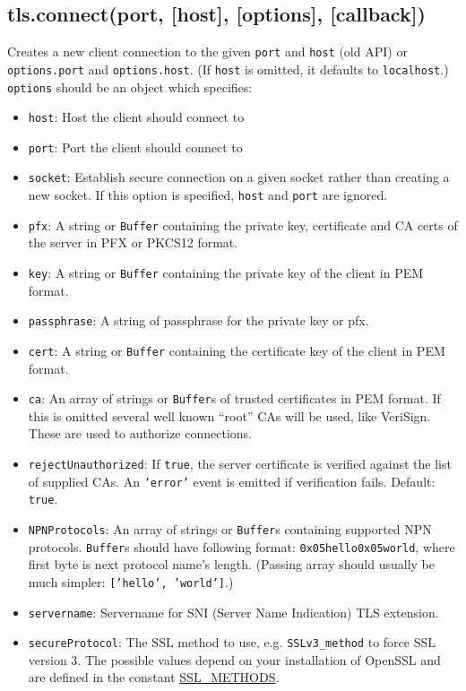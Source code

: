 \subsection{tls.connect(port, {[}host{]}, {[}options{]},
{[}callback{]})}

Creates a new client connection to the given \texttt{port} and
\texttt{host} (old API) or \texttt{options.port} and
\texttt{options.host}. (If \texttt{host} is omitted, it defaults to
\texttt{localhost}.) \texttt{options} should be an object which
specifies:

\begin{itemize}
\item
  \texttt{host}: Host the client should connect to
\item
  \texttt{port}: Port the client should connect to
\item
  \texttt{socket}: Establish secure connection on a given socket rather
  than creating a new socket. If this option is specified, \texttt{host}
  and \texttt{port} are ignored.
\item
  \texttt{pfx}: A string or \texttt{Buffer} containing the private key,
  certificate and CA certs of the server in PFX or PKCS12 format.
\item
  \texttt{key}: A string or \texttt{Buffer} containing the private key
  of the client in PEM format.
\item
  \texttt{passphrase}: A string of passphrase for the private key or
  pfx.
\item
  \texttt{cert}: A string or \texttt{Buffer} containing the certificate
  key of the client in PEM format.
\item
  \texttt{ca}: An array of strings or \texttt{Buffer}s of trusted
  certificates in PEM format. If this is omitted several well known
  ``root'' CAs will be used, like VeriSign. These are used to authorize
  connections.
\item
  \texttt{rejectUnauthorized}: If \texttt{true}, the server certificate
  is verified against the list of supplied CAs. An \texttt{'error'}
  event is emitted if verification fails. Default: \texttt{true}.
\item
  \texttt{NPNProtocols}: An array of strings or \texttt{Buffer}s
  containing supported NPN protocols. \texttt{Buffer}s should have
  following format: \texttt{0x05hello0x05world}, where first byte is
  next protocol name's length. (Passing array should usually be much
  simpler: \texttt{{[}'hello', 'world'{]}}.)
\item
  \texttt{servername}: Servername for SNI (Server Name Indication) TLS
  extension.
\item
  \texttt{secureProtocol}: The SSL method to use, e.g.
  \texttt{SSLv3\_method} to force SSL version 3. The possible values
  depend on your installation of OpenSSL and are defined in the constant
  \href{http://www.openssl.org/docs/ssl/ssl.html\#DEALING\_WITH\_PROTOCOL\_METHODS}{SSL\_METHODS}.
\end{itemize}

